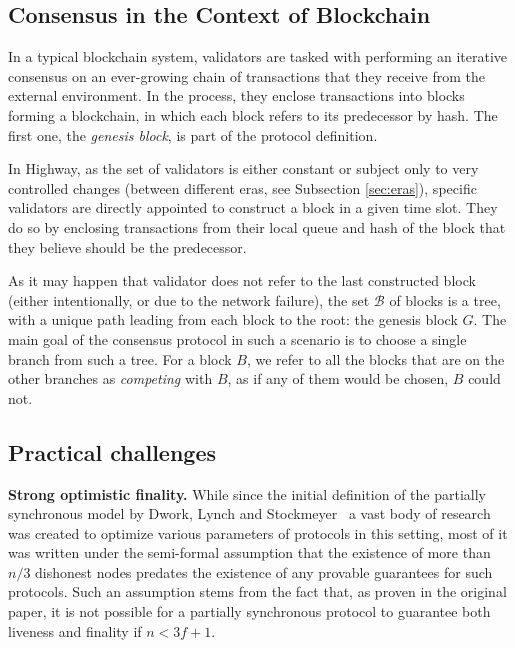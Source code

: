 \documentclass[12pt, fleqn]{article}
\begin{document}
\subsection{Consensus in the Context of Blockchain}

In a typical blockchain system, validators are tasked with performing an iterative consensus on an ever-growing chain of transactions that they receive from the external environment. 
In the process, they enclose transactions into blocks forming a blockchain, in which each block refers to its predecessor by hash.
The first one, the \emph{genesis block}, is part of the protocol definition. 

In Highway, as the set of validators is either constant or subject only to very controlled changes (between different eras, see Subsection \ref{sec:eras}), specific validators are directly appointed to construct a block in a given time slot.
They do so by enclosing transactions from their local queue and hash of the block that they believe should be the predecessor.

As it may happen that validator does not refer to the last constructed block (either intentionally, or due to the network failure), the set $\mathcal{B}$ of blocks is a tree, with a unique path leading from each block to the root: the genesis block $G$. 
The main goal of the consensus protocol in such a scenario is to choose a single branch from such a tree.
For a block $B$, we refer to all the blocks that are on the other branches as \emph{competing} with $B$, as if any of them would be chosen, $B$ could not.


\subsection{Practical challenges}

{\bf Strong optimistic finality.} While since the initial definition of the partially synchronous model by Dwork, Lynch and Stockmeyer~\cite{DLS88} a vast body of research was created to optimize various parameters of protocols in this setting, most of it was written under the semi-formal assumption that the existence of more than $n/3$ dishonest nodes predates the existence of any provable guarantees for such protocols.
Such an assumption stems from the fact that, as proven in the original paper, it is not possible for a partially synchronous protocol to guarantee both liveness and finality if $n<3f+1$.
\end{document}
